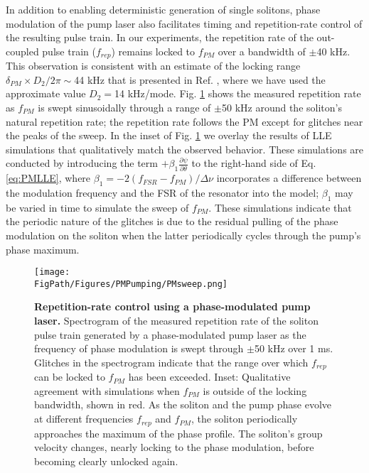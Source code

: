In addition to enabling deterministic generation of single solitons, phase modulation of the pump laser also facilitates timing and repetition-rate control of the resulting pulse train.  In our experiments, the repetition rate of the out-coupled pulse train ($f_{rep}$) remains locked to $f_{PM}$ over a bandwidth of $\pm$40 kHz. This observation is consistent with an estimate of the locking range $\delta_{PM}\times D_2/2\pi\sim$44 kHz that is presented in Ref. \cite{Jang2015a}, where we have used the approximate value $D_2=$14 kHz/mode. Fig. \ref{fig:PMsweep} shows the measured repetition rate as $f_{PM}$ is swept sinusoidally through a range of $\pm$50 kHz around the soliton's natural repetition rate; the repetition rate follows the PM except for glitches near the peaks of the sweep. In the inset of Fig. \ref{fig:PMsweep} we overlay the results of LLE simulations that qualitatively match the observed behavior. These simulations are conducted by introducing the term $+\beta_1\frac{\partial\psi}{\partial\theta}$ to the right-hand side of Eq. \ref{eq:PMLLE}, where $\beta_1=-2(f_{FSR}-f_{PM})/\Delta\nu$ incorporates a difference between the modulation frequency and the FSR of the resonator into the model; $\beta_1$ may be varied in time to simulate the sweep of $f_{PM}$. These simulations indicate that the periodic nature of the glitches is due to the residual pulling of the phase modulation on the soliton when the latter periodically cycles through the pump's phase maximum.

\begin{figure}[htpb]
	\begin{center}
		\texttt{[image: \\FigPath/Figures/PMPumping/PMsweep.png]}
	\end{center}
	\caption[Repetition-rate control using a phase-modulated pump laser]{\textbf{Repetition-rate control using a phase-modulated pump laser.} Spectrogram of the measured repetition rate of the soliton pulse train generated by a phase-modulated pump laser as the frequency of phase modulation is swept through $\pm$50 kHz over 1 ms. Glitches in the spectrogram indicate that the range over which $f_{rep}$ can be locked to $f_{PM}$ has been exceeded. Inset: Qualitative agreement with simulations when $f_{PM}$ is outside of the locking bandwidth, shown in red. As the soliton and the pump phase evolve at different frequencies $f_{rep}$ and $f_{PM}$, the soliton periodically approaches the maximum of the phase profile. The soliton's group velocity changes, nearly locking to the phase modulation, before becoming clearly unlocked again.}
	\label{fig:PMsweep}
\end{figure} 


